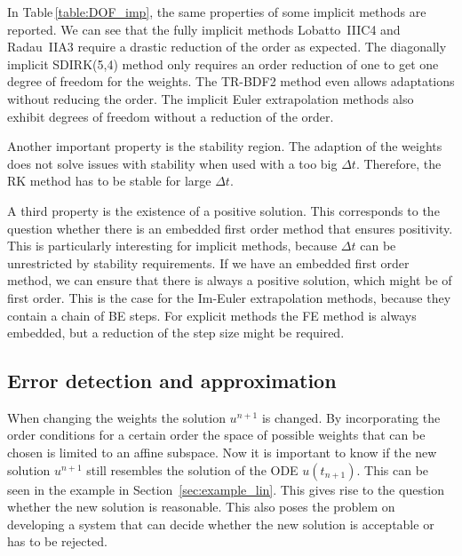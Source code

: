 \documentclass[a4paper]{article}
\numberwithin{equation}{section}
\theoremstyle{plain}
\theoremstyle{definition}
\numberwithin{theorem}{section}
\newcommand{\dt}{{\Delta t}}
\newcommand{\1}{\mathbbm{1}}
\begin{document}
In Table\,\ref{table:DOF_imp}, the same properties of some implicit
methods are reported.
We can see that the fully implicit methods Lobatto~IIIC4 and Radau~IIA3 require a drastic reduction of the order as expected.
The diagonally implicit SDIRK(5,4) method only requires an order reduction of one to get one degree of freedom for the weights.
The TR-BDF2 method even allows adaptations without reducing the order.  
The implicit Euler extrapolation methods also exhibit degrees of freedom without a reduction of the order.

Another important property is the stability region. 
The adaption of the weights does not solve issues with stability when used with a too big $\dt$. Therefore, the RK method has to be stable for large $\dt$.


A third property is the existence of a positive solution. This corresponds to the question whether there is an embedded first order method that ensures positivity. This is particularly interesting for implicit methods, because $\dt$ can be unrestricted by stability requirements.
If we have an embedded first order method, we can ensure that there is always a positive solution, which might be of first order.
This is the case for the Im-Euler extrapolation methods, because they contain a chain of BE steps. 
For explicit methods the FE method is always embedded, but a reduction of the step size might be required. 

\subsection{Error detection and approximation}
When changing the weights the solution $u^{n+1}$ is changed. 
By incorporating the order conditions for a certain order the space of possible weights that can be chosen is limited to an affine subspace.
Now it is important to know if the new solution $u^{n+1}$ still resembles the solution of the ODE $u(t_{n+1})$. 
This can be seen in the example in Section~\ref{sec:example_lin}.
This gives rise to the question whether the new solution is reasonable.
This also poses the problem on developing a system that can decide whether the new solution is acceptable or has to be rejected.
\end{document}
